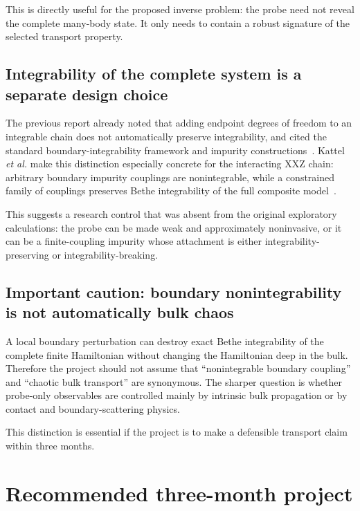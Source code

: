 \documentclass[11pt,a4paper]{article}
\begin{document}
This is directly useful for the proposed inverse problem: the probe need not reveal the complete many-body state.  It only needs to contain a robust signature of the selected transport property.

\subsection{Integrability of the complete system is a separate design choice}
The previous report already noted that adding endpoint degrees of freedom to an integrable chain does not automatically preserve integrability, and cited the standard boundary-integrability framework and impurity constructions~\cite{sklyanin1988,andrei1984,hou2000}.  Kattel \emph{et al.} make this distinction especially concrete for the interacting XXZ chain: arbitrary boundary impurity couplings are nonintegrable, while a constrained family of couplings preserves Bethe integrability of the full composite model~\cite{kattel2025}.

This suggests a research control that was absent from the original exploratory calculations: the probe can be made weak and approximately noninvasive, or it can be a finite-coupling impurity whose attachment is either integrability-preserving or integrability-breaking.

\subsection{Important caution: boundary nonintegrability is not automatically bulk chaos}
A local boundary perturbation can destroy exact Bethe integrability of the complete finite Hamiltonian without changing the Hamiltonian deep in the bulk.  Therefore the project should not assume that ``nonintegrable boundary coupling'' and ``chaotic bulk transport'' are synonymous.  The sharper question is whether probe-only observables are controlled mainly by intrinsic bulk propagation or by contact and boundary-scattering physics.

This distinction is essential if the project is to make a defensible transport claim within three months.

\section{Recommended three-month project}
\end{document}

